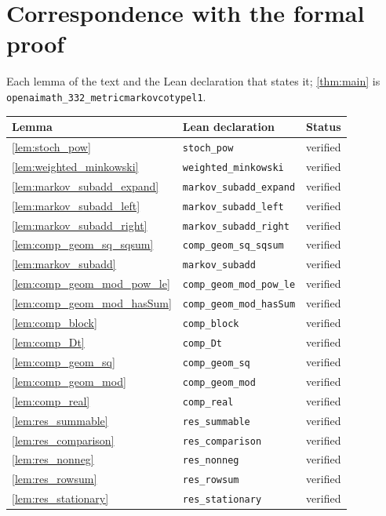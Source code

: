\documentclass[11pt]{article}
\theoremstyle{definition}
\theoremstyle{remark}
\begin{document}
\appendix
\section{Correspondence with the formal proof}
Each lemma of the text and the Lean declaration that states it; \cref{thm:main} is \texttt{openaimath\_332\_metricmarkovcotypel1}.

\begin{longtable}{@{}lll@{}}
\toprule
Lemma & Lean declaration & Status \\
\midrule
\endhead
\cref{lem:stoch_pow} & \texttt{stoch\_pow} & verified \\
\cref{lem:weighted_minkowski} & \texttt{weighted\_minkowski} & verified \\
\cref{lem:markov_subadd_expand} & \texttt{markov\_subadd\_expand} & verified \\
\cref{lem:markov_subadd_left} & \texttt{markov\_subadd\_left} & verified \\
\cref{lem:markov_subadd_right} & \texttt{markov\_subadd\_right} & verified \\
\cref{lem:comp_geom_sq_sqsum} & \texttt{comp\_geom\_sq\_sqsum} & verified \\
\cref{lem:markov_subadd} & \texttt{markov\_subadd} & verified \\
\cref{lem:comp_geom_mod_pow_le} & \texttt{comp\_geom\_mod\_pow\_le} & verified \\
\cref{lem:comp_geom_mod_hasSum} & \texttt{comp\_geom\_mod\_hasSum} & verified \\
\cref{lem:comp_block} & \texttt{comp\_block} & verified \\
\cref{lem:comp_Dt} & \texttt{comp\_Dt} & verified \\
\cref{lem:comp_geom_sq} & \texttt{comp\_geom\_sq} & verified \\
\cref{lem:comp_geom_mod} & \texttt{comp\_geom\_mod} & verified \\
\cref{lem:comp_real} & \texttt{comp\_real} & verified \\
\cref{lem:res_summable} & \texttt{res\_summable} & verified \\
\cref{lem:res_comparison} & \texttt{res\_comparison} & verified \\
\cref{lem:res_nonneg} & \texttt{res\_nonneg} & verified \\
\cref{lem:res_rowsum} & \texttt{res\_rowsum} & verified \\
\cref{lem:res_stationary} & \texttt{res\_stationary} & verified \\

\end{longtable}
\end{document}
